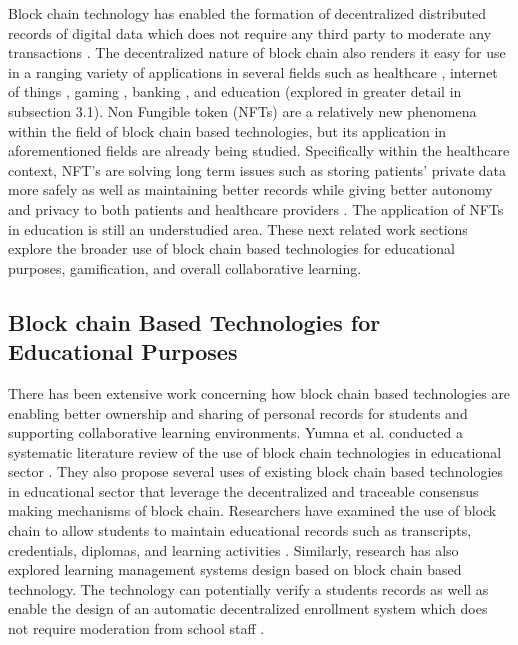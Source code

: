 \documentclass[acmsmall,nonacm]{acmart}
\begin{document}
Block chain technology has enabled the formation of decentralized distributed records of digital data which does not require any third party to moderate any transactions \cite{10.1007/978-3-030-14802-7_17}. The decentralized nature of block chain also renders it easy for use in a ranging variety of applications in several fields such as healthcare \cite{holbl2018systematic}, internet of things \cite{conoscenti2016blockchain}, gaming \cite{attaran2019blockchain}, banking \cite{cocco2017banking}, and education (explored in greater detail in subsection 3.1). Non Fungible token (NFTs) are a relatively new phenomena within the field of block chain based technologies, but its application in aforementioned fields are already being studied. Specifically within the healthcare context, NFT's are solving long term issues such as storing patients' private data more safely as well as maintaining better records while giving better autonomy and privacy to both patients and healthcare providers \cite{doi:10.1126/science.abm2004}. The application of NFTs in education is still an understudied area. These next related work sections explore the broader use of block chain based technologies for educational purposes, gamification, and overall collaborative learning.

\subsection{Block chain Based Technologies for Educational Purposes}

There has been extensive work concerning how block chain based technologies are enabling better ownership and sharing of personal records for students and supporting collaborative learning environments. Yumna et al. conducted a systematic literature review of the use of block chain technologies in educational sector \cite{yumna2019use}. They also propose several uses of existing block chain based technologies in educational sector that leverage the decentralized and traceable consensus making mechanisms of block chain. Researchers have examined the use of block chain to allow students to maintain educational records such as transcripts, credentials, diplomas, and learning activities \cite{grech2017blockchain, chen2018exploring, skiba2017potential}. Similarly, research has also explored learning management systems design based on block chain based technology. The technology can potentially verify a students records as well as enable the design of an automatic decentralized enrollment system which does not require moderation from school staff \cite{skiba2017potential}.
\end{document}

